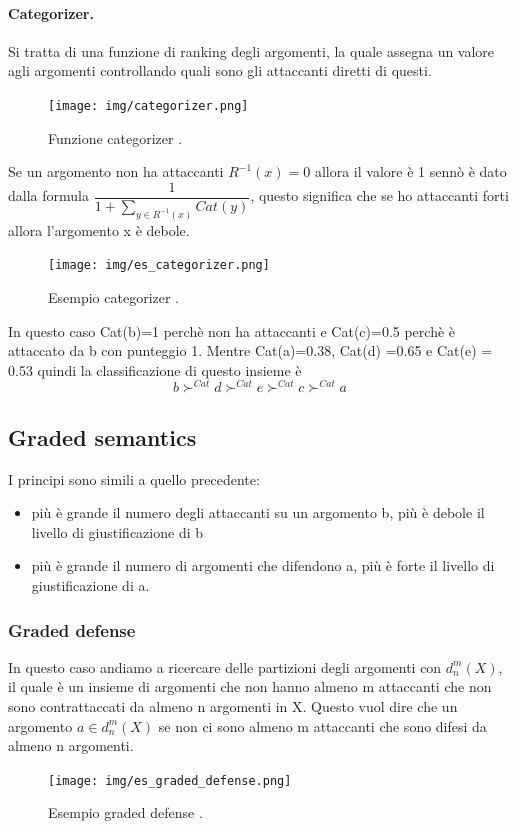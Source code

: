 \paragraph{Categorizer.} Si tratta di una funzione di ranking degli argomenti, la quale assegna un valore agli argomenti controllando quali sono gli attaccanti diretti di questi.

\begin{figure}[H]
    \centering
    \texttt{[image: img/categorizer.png]}
    \caption{Funzione categorizer .}\label{fig:fun_categorizer}
\end{figure}
Se un argomento non ha attaccanti $R^{-1}(x) = 0$ allora il valore è 1 sennò è dato dalla formula $\dfrac{1}{1+ \sum_{y \in R^{-1}(x)}^{}Cat(y)}$, questo significa che se ho attaccanti forti allora l'argomento x è debole.
\begin{figure}[H]
    \centering
    \texttt{[image: img/es\_categorizer.png]}
    \caption{Esempio categorizer .}\label{fig:es_categorizer}
\end{figure}
In questo caso Cat(b)=1 perchè non ha attaccanti e Cat(c)=0.5 perchè è attaccato da b con punteggio 1. Mentre Cat(a)=0.38, Cat(d) =0.65 e Cat(e) = 0.53 quindi la classificazione di questo insieme è 
\[b\succ^{Cat}d\succ^{Cat}e\succ^{Cat}c\succ^{Cat}a\]

\subsection{Graded semantics}
I principi sono simili a quello precedente:
\begin{itemize}
    \item più è grande il numero degli attaccanti su un argomento b, più è debole il livello di giustificazione di b
    \item più è grande il numero di argomenti che difendono a, più è forte il livello di giustificazione di a.
\end{itemize}

\subsubsection{Graded defense}
In questo caso andiamo a ricercare delle partizioni degli argomenti con $d_n^{m}(X)$, il quale è un insieme di argomenti che non hanno almeno m attaccanti che non sono contrattaccati da almeno n argomenti in X. Questo vuol dire che un argomento $a\in d_n^{m}(X)$ se non ci sono almeno m attaccanti che sono difesi da almeno n argomenti.
\begin{figure}[H]
    \centering
    \texttt{[image: img/es\_graded\_defense.png]}
    \caption{Esempio graded defense .}\label{fig:es_graded_defense}
\end{figure}

